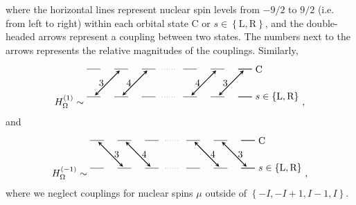 \documentclass[aps,nofootinbib,notitlepage,11pt]{revtex4-1}
\renewcommand{\set}[1]{\left\{#1\right\}} %
\renewcommand{\L}{\text{L}}
\newcommand{\C}{\text{C}}
\newcommand{\R}{\text{R}}
\newcommand{\1}{\mathds{1}}
\begin{document}
where the horizontal lines represent nuclear spin levels from $-9/2$
to $9/2$ (i.e. from left to right) within each orbital state $\C$ or
$s\in\set{\L,\R}$, and the double-headed arrows represent a coupling
between two states.  The numbers next to the arrows represents the
relative magnitudes of the couplings.  Similarly,
\begin{align}
  H_\Omega^{(1)} \sim
  \begin{tikzpicture}[
    scale=0.5,
    trans/.style={thick,<->,shorten >=2pt,shorten <=2pt,>=stealth}
    ]
    \draw (0,0) -- (1,0);
    \draw (2,0) -- (3,0);
    \draw (4,0) -- (5,0);
    \draw[dotted] (5.5,0) -- (6.5,0);
    \draw (7,0) -- (8,0);
    \draw (9,0) -- (10,0);
    \draw (11,0) -- (12,0);
    \draw (11,0) -- (12,0) node[right] {$\C$};
    \draw (0,-2) -- (1,-2);
    \draw (2,-2) -- (3,-2);
    \draw (4,-2) -- (5,-2);
    \draw[dotted] (5.5,-2) -- (6.5,-2);
    \draw (7,-2) -- (8,-2);
    \draw (9,-2) -- (10,-2);
    \draw (11,-2) -- (12,-2);
    \draw (11,-2) -- (12,-2) node[right] {$s\in\set{\L,\R}$};
    \draw[trans] (0.5,-2) -- (2.5,0) node[midway,left] {$3$};
    \draw[trans] (2.5,-2) -- (4.5,0) node[midway,left] {$4$};
    \draw[trans] (7.5,-2) -- (9.5,0) node[midway,left] {$4$};
    \draw[trans] (9.5,-2) -- (11.5,0) node[midway,left] {$3$};
  \end{tikzpicture},
  \label{eq:H_O_+}
\end{align}
and
\begin{align}
  H_\Omega^{(-1)} \sim
  \begin{tikzpicture}[
    scale=0.5,
    trans/.style={thick,<->,shorten >=2pt,shorten <=2pt,>=stealth}
    ]
    \draw (0,0) -- (1,0);
    \draw (2,0) -- (3,0);
    \draw (4,0) -- (5,0);
    \draw[dotted] (5.5,0) -- (6.5,0);
    \draw (7,0) -- (8,0);
    \draw (9,0) -- (10,0);
    \draw (11,0) -- (12,0);
    \draw (11,0) -- (12,0) node[right] {$\C$};
    \draw (0,-2) -- (1,-2);
    \draw (2,-2) -- (3,-2);
    \draw (4,-2) -- (5,-2);
    \draw[dotted] (5.5,-2) -- (6.5,-2);
    \draw (7,-2) -- (8,-2);
    \draw (9,-2) -- (10,-2);
    \draw (11,-2) -- (12,-2);
    \draw (11,-2) -- (12,-2) node[right] {$s\in\set{\L,\R}$};
    \draw[trans] (0.5,0) -- (2.5,-2) node[midway,right] {$3$};
    \draw[trans] (2.5,0) -- (4.5,-2) node[midway,right] {$4$};
    \draw[trans] (7.5,0) -- (9.5,-2) node[midway,right] {$4$};
    \draw[trans] (9.5,0) -- (11.5,-2) node[midway,right] {$3$};
  \end{tikzpicture},
  \label{eq:H_O_-}
\end{align}
where we neglect couplings for nuclear spins $\mu$ outside of
$\set{-I,-I+1,I-1,I}$.
\end{document}
